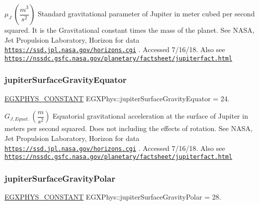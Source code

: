 $ \mu_{J} \ (\dfrac{m^3}{s^2})$ Standard gravitational parameter of Jupiter in meter cubed per second squared. It is the Gravitational constant times the mass of the planet. See N\+A\+SA, Jet Propulsion Laboratory, Horizon for data \href{https://ssd.jpl.nasa.gov/horizons.cgi}{\tt https\+://ssd.\+jpl.\+nasa.\+gov/horizons.\+cgi} . Accessed 7/16/18. Also see \href{https://nssdc.gsfc.nasa.gov/planetary/factsheet/jupiterfact.html}{\tt https\+://nssdc.\+gsfc.\+nasa.\+gov/planetary/factsheet/jupiterfact.\+html} \mbox{\label{group___e_g_x_phys-_constants-_astrophysics-_solar_system-_jupiter-_bulk_ga453ce834b062055a91b1fd594428fa6c}} 
\subsubsection{\texorpdfstring{jupiter\+Surface\+Gravity\+Equator}{jupiterSurfaceGravityEquator}}
{\footnotesize\ttfamily \mbox{\hyperlink{group___e_g_x_phys-_constants-_macros_ga76980d288494ce1714c9ac68a95ba702}{E\+G\+X\+P\+H\+Y\+S\+\_\+\+C\+O\+N\+S\+T\+A\+NT}} E\+G\+X\+Phys\+::jupiter\+Surface\+Gravity\+Equator = 24.}

$ G_{J,Equat.} \ (\dfrac{m}{s^2})$ Equatorial gravitational acceleration at the surface of Jupiter in meters per second squared. Does not including the effects of rotation. See N\+A\+SA, Jet Propulsion Laboratory, Horizon for data \href{https://ssd.jpl.nasa.gov/horizons.cgi}{\tt https\+://ssd.\+jpl.\+nasa.\+gov/horizons.\+cgi} . Accessed 7/16/18. Also see \href{https://nssdc.gsfc.nasa.gov/planetary/factsheet/jupiterfact.html}{\tt https\+://nssdc.\+gsfc.\+nasa.\+gov/planetary/factsheet/jupiterfact.\+html} \mbox{\label{group___e_g_x_phys-_constants-_astrophysics-_solar_system-_jupiter-_bulk_ga43cd8191d01a0990fd9104a4521b981b}} 
\subsubsection{\texorpdfstring{jupiter\+Surface\+Gravity\+Polar}{jupiterSurfaceGravityPolar}}
{\footnotesize\ttfamily \mbox{\hyperlink{group___e_g_x_phys-_constants-_macros_ga76980d288494ce1714c9ac68a95ba702}{E\+G\+X\+P\+H\+Y\+S\+\_\+\+C\+O\+N\+S\+T\+A\+NT}} E\+G\+X\+Phys\+::jupiter\+Surface\+Gravity\+Polar = 28.}

